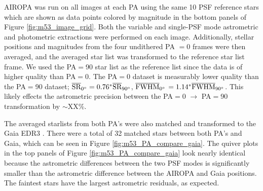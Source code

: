 \documentclass[]{spie}  %
\begin{document}
AIROPA was run on all images at each PA using the same 10 PSF reference stars which are shown as data points colored by magnitude in the bottom panels of Figure \ref{fig:m53_image_grid}. Both the variable and single-PSF mode astrometric and photometric extractions were performed on each image. Additionally, stellar positions and magnitudes from the four undithered PA $=0$ frames were then averaged, and the averaged star list was transformed to the reference star list frame. We used the PA$=$90 star list as the reference list since the data is of higher quality than PA$=$0. The PA$=$0 dataset is measurably lower quality than the PA$=$90 dataset; $\overline{\textrm{SR}}_{0\degree} = 0.76^{*}\overline{\textrm{SR}}_{90\degree}$, $\overline{\textrm{FWHM}}_{0\degree}$ $= 1.14^{*}\overline{\textrm{FWHM}}_{90\degree}$. This likely effects the astrometric precision between the PA$=$0 $\rightarrow$ PA$=$90 transformation by $\sim$XX\%.

The averaged starlists from both PA's were also matched and transformed to the Gaia EDR3 \citep{brown:2021a}. There were a total of 32 matched stars between both PA's and Gaia, which can be seen in Figure \ref{fig:m53_PA_compare_gaia}. The quiver plots in the top panels of Figure \ref{fig:m53_PA_compare_gaia} look nearly identical because the astrometric differences between the two PSF modes is significantly smaller than the astrometric difference between the AIROPA and Gaia positions. The faintest stars have the largest astrometric residuals, as expected. 
\end{document}
